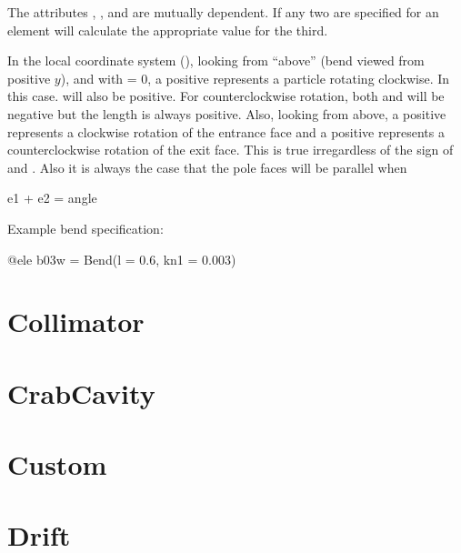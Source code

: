 

The attributes , , and  are mutually dependent. If any two are specified for
an element \bmad will calculate the appropriate value for the third.

In the local coordinate system (), looking from ``above'' (bend viewed from positive
$y$), and with  = 0, a positive  represents a particle rotating clockwise. In
this case.  will also be positive. For counterclockwise rotation, both  and 
will be negative but the length  is always positive. Also, looking from above, a positive
 represents a clockwise rotation of the entrance face and a positive  represents a
counterclockwise rotation of the exit face. This is true irregardless of the sign of  and
. Also it is always the case that the pole faces will be parallel when
\begin{example}
  e1 + e2 = angle
\end{example}

Example bend specification:
\begin{example}
  @ele b03w = Bend(l = 0.6, kn1 = 0.003)
\end{example}

\newpage

\section{Collimator}
\label{s:collimator}


\section{CrabCavity}
\label{s:crab}


\section{Custom}
\label{s:custom}


\section{Drift}
\label{s:drift}


